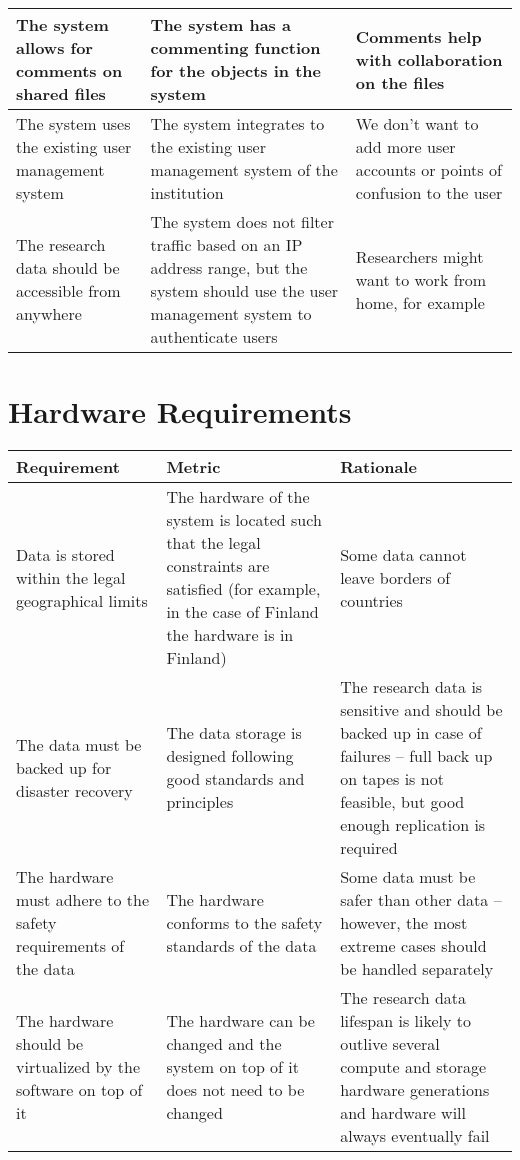 \begin{tabularx}{\textwidth}{| >{\raggedright}p{3cm} | >{\raggedright}p{3cm} | X |}
    \hline
    The system allows for comments on shared files &The system has a commenting function for the objects in the system & Comments help with collaboration on the files\\
    \hline
    \rowcolor{Gray}
    The system uses the existing user management system &The system integrates to the existing user management system of the institution &We don’t want to add more user accounts or points of confusion to the user\\
    \hline
    The research data should be accessible from anywhere  &The system does not filter traffic based on an IP address range, but the system should use the user management system to authenticate users  & Researchers might want to work from home, for example\\
    \hline
\end{tabularx}

\section{Hardware Requirements}

\tabcolsep=0.11cm
\begin{tabularx}{\textwidth}{| >{\raggedright}p{3cm} | >{\raggedright}p{3cm} | X |}
    \hline
    \textbf{Requirement} & \textbf{Metric}& \textbf{Rationale} \\
    \hline
    \rowcolor{Gray}
    Data is stored within the legal geographical limits &The hardware of the system is located such that the legal constraints are satisfied (for example, in the case of Finland the hardware is in Finland) & Some data cannot leave borders of countries\\
    \hline
    The data must be backed up for disaster recovery&The data storage is designed following good standards and principles &The research data is sensitive and should be backed up in case of failures – full back up on tapes is not feasible, but good enough replication is required\\
    \hline
    \rowcolor{Gray}
    The hardware must adhere to the safety requirements of the data &The hardware conforms to the safety standards of the data&Some data must be safer than other data – however, the most extreme cases should be handled separately\\
    \hline
    The hardware should be virtualized by the software on top of it &The hardware can be changed and the system on top of it does not need to be changed & The research data lifespan is likely to outlive several compute and storage hardware generations and hardware will always eventually fail\\
    \hline
\end{tabularx}

